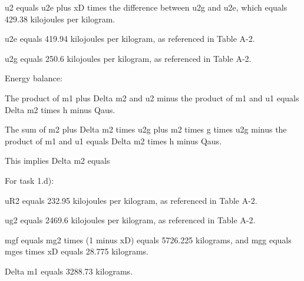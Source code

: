 u2 equals u2e plus xD times the difference between u2g and u2e, which equals 429.38 kilojoules per kilogram.

u2e equals 419.94 kilojoules per kilogram, as referenced in Table A-2.

u2g equals 250.6 kilojoules per kilogram, as referenced in Table A-2.

Energy balance:

The product of m1 plus Delta m2 and u2 minus the product of m1 and u1 equals Delta m2 times h minus Qaus.

The sum of m2 plus Delta m2 times u2g plus m2 times g times u2g minus the product of m1 and u1 equals Delta m2 times h minus Qaus.

This implies Delta m2 equals

For task 1.d):

uR2 equals 232.95 kilojoules per kilogram, as referenced in Table A-2.

ug2 equals 2469.6 kilojoules per kilogram, as referenced in Table A-2.

mgf equals mg2 times (1 minus xD) equals 5726.225 kilograms, and mgg equals mges times xD equals 28.775 kilograms.

Delta m1 equals 3288.73 kilograms.